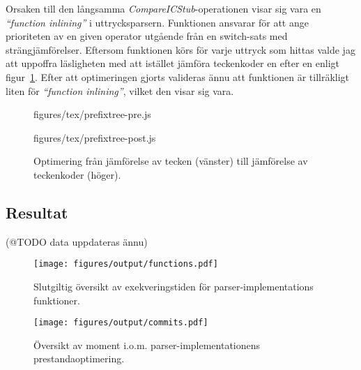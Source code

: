 Orsaken till den långsamma \textit{CompareICStub}-operationen visar sig vara
en \textit{``function inlining''} i uttrycksparsern. Funktionen ansvarar för
att ange prioriteten av en given operator utgående från en switch-sats
med strängjämförelser. Eftersom funktionen körs för varje uttryck som hittas
valde jag att uppoffra läsligheten med att istället jämföra teckenkoder en
efter en enligt figur~\ref{fig:switchtree}. Efter att optimeringen
gjorts valideras ännu att funktionen är tillräkligt liten för
\textit{``function inlining''}, vilket den visar sig vara.

\begin{figure}[ht]
  \begin{minipage}[t]{0.5\textwidth}
      {figures/tex/prefixtree-pre.js}
  \end{minipage}%
  \begin{minipage}[t]{0.5\textwidth}
      {figures/tex/prefixtree-post.js}
  \end{minipage}
  \caption{Optimering från jämförelse av tecken (vänster) till jämförelse av teckenkoder (höger).}
  \label{fig:switchtree}
\end{figure}

\subsection{Resultat}

(@TODO data uppdateras ännu)

\begin{figure}[ht]
  \texttt{[image: figures/output/functions.pdf]}
  \caption{Slutgiltig översikt av exekveringstiden för parser-implementations
    funktioner.}
\end{figure}

\begin{figure}[ht]
  \texttt{[image: figures/output/commits.pdf]}
  \caption{Översikt av moment i.o.m. parser-implementationens
    prestandaoptimering.}
\end{figure}

